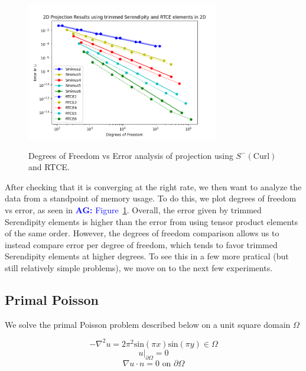 \documentclass[manuscript,screen]{acmart}
\newcommand{\akg}[1]{\textcolor{blue}{\textbf{AG:} #1}}
\begin{document}
  \begin{figure}[h!]
    \caption{Degrees of Freedom vs Error analysis of projection using $S^-(\text{Curl})$ and RTCE.}
    \includegraphics[width=0.75\textwidth]{2dProjection.png}
    \label{fig:2dProjection}
  \end{figure}
  
  \noindent After checking that it is converging at the right rate, we then want to analyze the data from a standpoint of memory usage.  To do this, we plot degrees of freedom vs error, as seen in \akg{Figure}~\ref{fig:2dProjection}.  Overall, the error given by trimmed Serendipity elements is higher than the error from using tensor product elements of the same order.  However, the degrees of freedom comparison allows us to instead compare error per degree of freedom, which tends to favor trimmed Serendipity elements at higher degrees.  To see this in a few more pratical (but still relatively simple problems), we move on to the next few experiments.
  



  \subsection{Primal Poisson}
  
\noindent We solve the primal Poisson problem described below on a unit square domain $\Omega$

\begin{equation}
    -\nabla^2 u = 2\pi^2\text{sin}(\pi x)\text{sin}(\pi y) \in \Omega
\end{equation}
\begin{equation*}
    u\vert_{\partial \Omega} = 0
\end{equation*}
\begin{equation*}
   \nabla u \cdot n = 0 \text{ on } \partial \Omega
\end{equation*}
\end{document}
